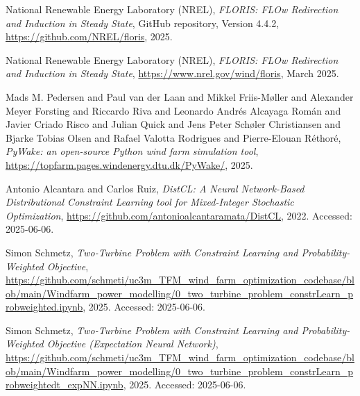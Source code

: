 \documentclass[preprint,12pt]{elsarticle}
\begin{document}
\begin{thebibliography}{00}
National Renewable Energy Laboratory (NREL),
\textit{FLORIS: FLOw Redirection and Induction in Steady State},
GitHub repository,
Version 4.4.2,
\url{https://github.com/NREL/floris},
2025.

National Renewable Energy Laboratory (NREL),
\textit{FLORIS: FLOw Redirection and Induction in Steady State},
\url{https://www.nrel.gov/wind/floris},
March 2025.

Mads M. Pedersen and Paul van der Laan and Mikkel Friis-Møller and Alexander Meyer Forsting and Riccardo Riva and Leonardo Andrés Alcayaga Román and Javier Criado Risco and Julian Quick and Jens Peter Schøler Christiansen and Bjarke Tobias Olsen and Rafael Valotta Rodrigues and Pierre-Elouan Réthoré,
\textit{PyWake: an open-source Python wind farm simulation tool},
\url{https://topfarm.pages.windenergy.dtu.dk/PyWake/},
2025.


Antonio Alcantara and Carlos Ruiz,
\textit{DistCL: A Neural Network-Based Distributional Constraint Learning tool for Mixed-Integer Stochastic Optimization},
\url{https://github.com/antonioalcantaramata/DistCL},
2022.
Accessed: 2025-06-06.

Simon Schmetz,
\textit{Two-Turbine Problem with Constraint Learning and Probability-Weighted Objective},
\url{https://github.com/schmeti/uc3m_TFM_wind_farm_optimization_codebase/blob/main/Windfarm_power_modelling/0_two_turbine_problem_constrLearn_probweighted.ipynb},
2025.
Accessed: 2025-06-06.

Simon Schmetz,
\textit{Two-Turbine Problem with Constraint Learning and Probability-Weighted Objective (Expectation Neural Network)},
\url{https://github.com/schmeti/uc3m_TFM_wind_farm_optimization_codebase/blob/main/Windfarm_power_modelling/0_two_turbine_problem_constrLearn_probweightedt_expNN.ipynb},
2025.
Accessed: 2025-06-06.


\end{thebibliography}
\end{document}

